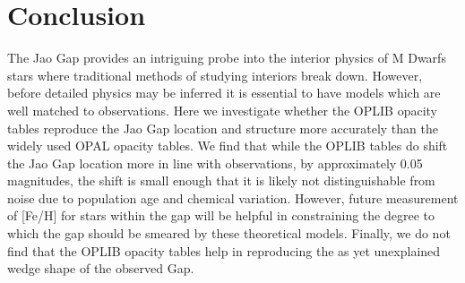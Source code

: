 \section{Conclusion}\label{sec:conclusion}
%
%
The Jao Gap provides an intriguing probe into the interior physics of M Dwarfs
stars where traditional methods of studying interiors break down. However,
before detailed physics may be inferred it is essential to have models which
are well matched to observations. Here we investigate whether the OPLIB opacity
tables reproduce the Jao Gap location and structure more accurately than the
widely used OPAL opacity tables. We find that while the OPLIB tables do shift
the Jao Gap location more in line with observations, by approximately 0.05
magnitudes, the shift is small enough that it is likely not distinguishable
from noise due to population age and chemical variation. However, future
measurement of [Fe/H] for stars within the gap will be helpful in constraining
the degree to which the gap should be smeared by these theoretical models.
Finally, we do not find that the OPLIB opacity tables help in reproducing the
as yet unexplained wedge shape of the observed Gap.
